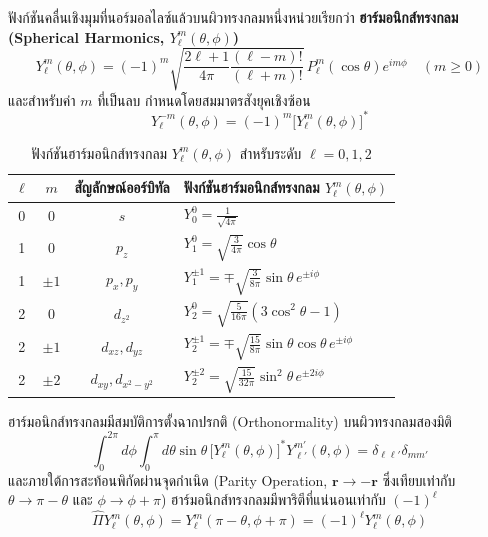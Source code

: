 ฟังก์ชันคลื่นเชิงมุมที่นอร์มอลไลซ์แล้วบนผิวทรงกลมหนึ่งหน่วยเรียกว่า \textbf{ฮาร์มอนิกส์ทรงกลม (Spherical Harmonics, $Y_\ell^m(\theta, \phi)$)}
\begin{equation}
Y_\ell^m(\theta, \phi) = (-1)^m \sqrt{\frac{2\ell + 1}{4\pi} \frac{(\ell - m)!}{(\ell + m)!}} \, P_\ell^m(\cos\theta) e^{im\phi} \quad (m \ge 0)
\label{eq:spherical_harmonics_exact}
\end{equation}
และสำหรับค่า $m$ ที่เป็นลบ กำหนดโดยสมมาตรสังยุคเชิงซ้อน
\begin{equation}
Y_\ell^{-m}(\theta, \phi) = (-1)^m \big[ Y_\ell^m(\theta, \phi) \big]^*
\end{equation}

\begin{table}[H]
\centering
\caption{ฟังก์ชันฮาร์มอนิกส์ทรงกลม $Y_\ell^m(\theta, \phi)$ สำหรับระดับ $\ell = 0, 1, 2$}
\label{tab:spherical_harmonics}
\begin{tabular}{cccl}
\hline
$\ell$ & $m$ & สัญลักษณ์ออร์บิทัล & ฟังก์ชันฮาร์มอนิกส์ทรงกลม $Y_\ell^m(\theta, \phi)$ \\
\hline
0 & 0 & $s$ & $Y_0^0 = \frac{1}{\sqrt{4\pi}}$ \\[6pt]
1 & 0 & $p_z$ & $Y_1^0 = \sqrt{\frac{3}{4\pi}} \cos\theta$ \\[6pt]
1 & $\pm 1$ & $p_x, p_y$ & $Y_1^{\pm 1} = \mp \sqrt{\frac{3}{8\pi}} \sin\theta \, e^{\pm i\phi}$ \\[6pt]
2 & 0 & $d_{z^2}$ & $Y_2^0 = \sqrt{\frac{5}{16\pi}} (3\cos^2\theta - 1)$ \\[6pt]
2 & $\pm 1$ & $d_{xz}, d_{yz}$ & $Y_2^{\pm 1} = \mp \sqrt{\frac{15}{8\pi}} \sin\theta\cos\theta \, e^{\pm i\phi}$ \\[6pt]
2 & $\pm 2$ & $d_{xy}, d_{x^2-y^2}$ & $Y_2^{\pm 2} = \sqrt{\frac{15}{32\pi}} \sin^2\theta \, e^{\pm 2i\phi}$ \\
\hline
\end{tabular}
\end{table}

ฮาร์มอนิกส์ทรงกลมมีสมบัติการตั้งฉากปรกติ (Orthonormality) บนผิวทรงกลมสองมิติ
\begin{equation}
\int_0^{2\pi} d\phi \int_0^\pi d\theta \sin\theta \, \big[ Y_\ell^m(\theta, \phi) \big]^* Y_{\ell'}^{m'}(\theta, \phi) = \delta_{\ell \ell'} \delta_{m m'}
\label{eq:spherical_harmonics_orthonormality}
\end{equation}
และภายใต้การสะท้อนพิกัดผ่านจุดกำเนิด (Parity Operation, $\mathbf{r} \to -\mathbf{r}$ ซึ่งเทียบเท่ากับ $\theta \to \pi - \theta$ และ $\phi \to \phi + \pi$) ฮาร์มอนิกส์ทรงกลมมีพาริตีที่แน่นอนเท่ากับ $(-1)^\ell$
\begin{equation}
\hat{\Pi} Y_\ell^m(\theta, \phi) = Y_\ell^m(\pi - \theta, \phi + \pi) = (-1)^\ell Y_\ell^m(\theta, \phi)
\end{equation}

